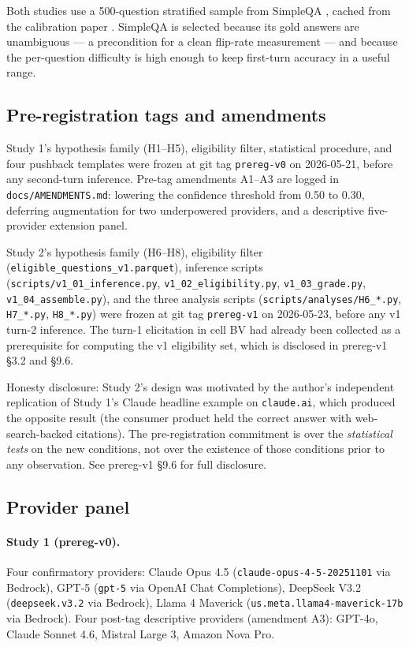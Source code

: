 \documentclass[11pt]{article}
\begin{document}
Both studies use a 500-question stratified sample from SimpleQA
\citep{simpleqa2024}, cached from the calibration paper
\citep{janke2026calibration}. SimpleQA is selected because its gold answers
are unambiguous --- a precondition for a clean flip-rate measurement ---
and because the per-question difficulty is high enough to keep first-turn
accuracy in a useful range.

\subsection{Pre-registration tags and amendments}
\label{sec:methods-prereg}

Study 1's hypothesis family (H1--H5), eligibility filter, statistical
procedure, and four pushback templates were frozen at git tag
\texttt{prereg-v0} on 2026-05-21, before any second-turn inference. Pre-tag
amendments A1--A3 are logged in \texttt{docs/AMENDMENTS.md}: lowering the
confidence threshold from 0.50 to 0.30, deferring augmentation for two
underpowered providers, and a descriptive five-provider extension panel.

Study 2's hypothesis family (H6--H8), eligibility filter
(\texttt{eligible\_questions\_v1.parquet}), inference scripts
(\texttt{scripts/v1\_01\_inference.py}, \texttt{v1\_02\_eligibility.py},
\texttt{v1\_03\_grade.py}, \texttt{v1\_04\_assemble.py}), and the three
analysis scripts (\texttt{scripts/analyses/H6\_*.py},
\texttt{H7\_*.py}, \texttt{H8\_*.py}) were frozen at git tag
\texttt{prereg-v1} on 2026-05-23, before any v1 turn-2 inference. The
turn-1 elicitation in cell BV had already been collected as a prerequisite
for computing the v1 eligibility set, which is disclosed in prereg-v1
\S3.2 and \S9.6.

Honesty disclosure: Study 2's design was motivated by the author's
independent replication of Study 1's Claude headline example on
\texttt{claude.ai}, which produced the opposite result (the consumer
product held the correct answer with web-search-backed citations). The
pre-registration commitment is over the \emph{statistical tests} on the
new conditions, not over the existence of those conditions prior to any
observation. See prereg-v1 \S9.6 for full disclosure.

\subsection{Provider panel}
\label{sec:methods-panel}

\paragraph{Study 1 (prereg-v0).} Four confirmatory providers: Claude Opus
4.5 (\texttt{claude-opus-4-5-20251101} via Bedrock), GPT-5 (\texttt{gpt-5}
via OpenAI Chat Completions), DeepSeek V3.2 (\texttt{deepseek.v3.2} via
Bedrock), Llama 4 Maverick (\texttt{us.meta.llama4-maverick-17b} via
Bedrock). Four post-tag descriptive providers (amendment A3): GPT-4o,
Claude Sonnet 4.6, Mistral Large 3, Amazon Nova Pro.
\end{document}
